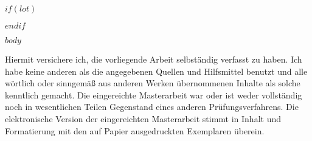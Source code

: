 \documentclass[a4paper,11pt]{article}
\begin{document}
	$if(lot)$
	\listoftables
	$endif$
	
	\newpage\null\thispagestyle{empty}
	\newpage
	\pagestyle{plain}
	\setcounter{page}{1}    %
	\justifying
	
	$body$
	
	\newpage
	Hiermit versichere ich, die vorliegende Arbeit selbständig verfasst zu haben. Ich habe keine anderen als die angegebenen Quellen und Hilfsmittel benutzt und alle wörtlich oder sinngemäß aus   anderen   Werken   übernommenen   Inhalte   als   solche   kenntlich   gemacht.   Die   eingereichte Masterarbeit  war  oder  ist  weder  vollständig  noch  in  wesentlichen  Teilen  Gegenstand  eines  anderen Prüfungsverfahrens.  Die  elektronische  Version  der  eingereichten  Masterarbeit  stimmt  in  Inhalt  und Formatierung mit den auf Papier ausgedruckten Exemplaren überein.
	
	
\end{document}
